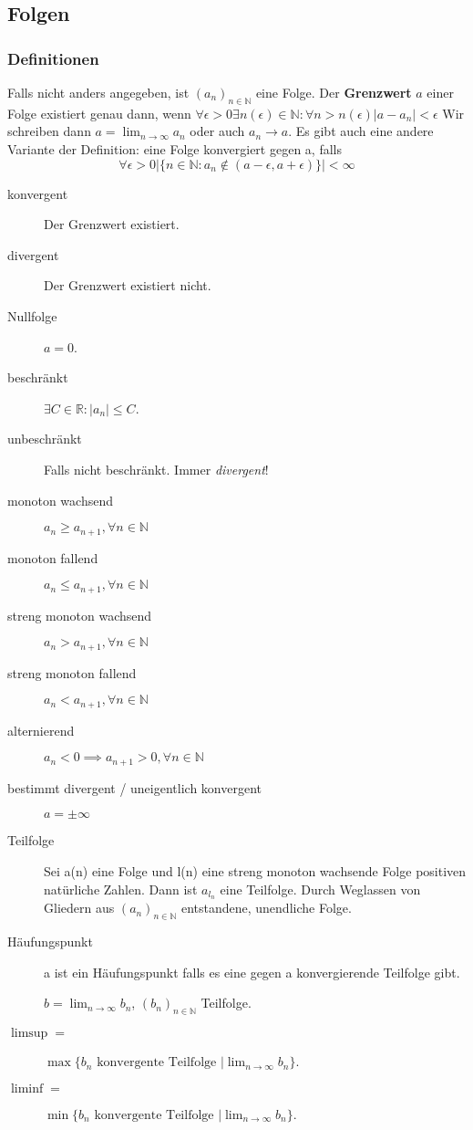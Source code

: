 \documentclass[a4paper, 9pt, DIV=24]{scrartcl}
\newcommand{\N}{\mathbb{N}}
\begin{document}
\subsection{Folgen}
\subsubsection{Definitionen}
Falls nicht anders angegeben, ist $(a_n)_{n\in\N}$ eine Folge.
Der \textbf{Grenzwert} $a$ einer Folge existiert genau dann,
wenn $\forall \epsilon > 0 \exists n(\epsilon) \in\N : \forall n>n(\epsilon) |a - a_n| < \epsilon$
Wir schreiben dann $a = \lim_{n\rightarrow\infty} a_n$ oder auch $a_n \rightarrow a$. Es gibt auch eine andere Variante der Definition:
eine Folge konvergiert gegen a, falls 
$$ \forall \epsilon >0 |\{n \in \N : a_n \not \in (a-\epsilon, a+ \epsilon)\}|<\infty $$
\begin{description}
 \item[konvergent] Der Grenzwert existiert.
 \item[divergent] Der Grenzwert existiert nicht.
 \item[Nullfolge] $a = 0$.
 \item[beschränkt] $\exists C\in\mathbb{R}: |a_n| \leq C$.
 \item[unbeschränkt] Falls nicht beschränkt. Immer \emph{divergent}!
 \item[monoton wachsend] $a_n \geq a_{n+1}, \forall{n\in\N}$
 \item[monoton fallend] $a_n \leq a_{n+1}, \forall{n\in\N}$
 \item[streng monoton wachsend] $a_n > a_{n+1}, \forall{n\in\N}$
 \item[streng monoton fallend] $a_n < a_{n+1}, \forall{n\in\N}$
 \item[alternierend] $a_n < 0 \implies a_{n+1} > 0, \forall{n\in\N}$
 \item[bestimmt divergent / uneigentlich konvergent] $a = \pm \infty$
 \item[Teilfolge] Sei a(n) eine Folge und l(n) eine streng monoton wachsende Folge positiven natürliche Zahlen. Dann ist $a_{l_n}$ eine Teilfolge. Durch Weglassen von Gliedern aus $(a_n)_{n\in\N}$ entstandene, unendliche Folge. 
 \item[Häufungspunkt] a ist ein Häufungspunkt falls es eine gegen a konvergierende Teilfolge gibt. 
 
 $b = \lim_{n\rightarrow\infty} b_n$, $(b_n)_{n\in\N}$ Teilfolge.
 \item[$\limsup =$] $\max\{b_n\text{ konvergente Teilfolge } | \lim_{n\rightarrow\infty} b_n\}$.
 \item[$\liminf =$] $\min\{b_n\text{ konvergente Teilfolge } | \lim_{n\rightarrow\infty} b_n\}$.
\end{description}
\end{document}
